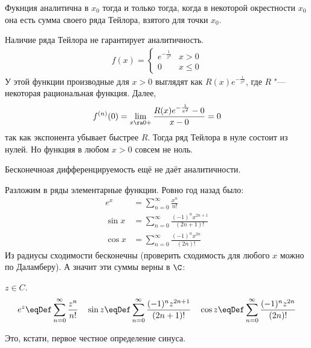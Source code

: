 \begin{conseq}
	Фукнция аналитична в $x_0$ тогда и только тогда, когда в некоторой окрестности $x_0$ она есть сумма своего ряда Тейлора, взятого для точки $x_0$.
\end{conseq}

\begin{exmp}
	Наличие ряда Тейлора не гарантирует аналитичность.
	\begin{gather*}
		f(x) = \begin{cases}
			e^{-\frac1{x^2}} & x > 0 \\
			0 & x \le 0
		\end{cases}
	\end{gather*}
	У этой функции производные для $x>0$ выглядят как $R(x)e^{-\frac1{x^2}}$, где $R$ "--- некоторая рациональная функция.
	Далее,
	\[
		f^{(n)}(0) = \lim_{x \ra 0+} \frac{R(x)e^{-\frac1{x^2}} - 0}{x - 0} = 0
	\]
	так как экспонента убывает быстрее $R$.
	Тогда ряд Тейлора в нуле состоит из нулей.
	Но функция в любом $x > 0$ совсем не ноль.
\end{exmp}

\begin{Rem}
	Бесконечноая дифференцируемость ещё не даёт аналитичности.
\end{Rem}

Разложим в ряды элементарные функции.
Ровно год назад было:
\begin{align*}
	e^x &= \sum_{n=0}^\infty \frac{x^n}{n!} \\
	\sin x &= \sum_{n=0}^\infty \frac{(-1)^n x^{2n+1}}{(2n+1)!} \\
	\cos x &= \sum_{n=0}^\infty \frac{(-1)^n x^{2n}}{(2n)!}
\end{align*}
Из радиусы сходимости бесконечны (проверить сходимость для любого $x$ можно по Даламберу).
А значит эти суммы верны в $\C$:
\begin{Def}
	$z \in C$.
	\[
		e^z \eqDef \sum_{n=0}^\infty \frac{z^n}{n!} \quad
		\sin z \eqDef \sum_{n=0}^\infty \frac{(-1)^n z^{2n+1}}{(2n+1)!} \quad
		\cos z \eqDef \sum_{n=0}^\infty \frac{(-1)^n z^{2n}}{(2n)!}
	\]
\end{Def}
Это, кстати, первое честное определение синуса.

